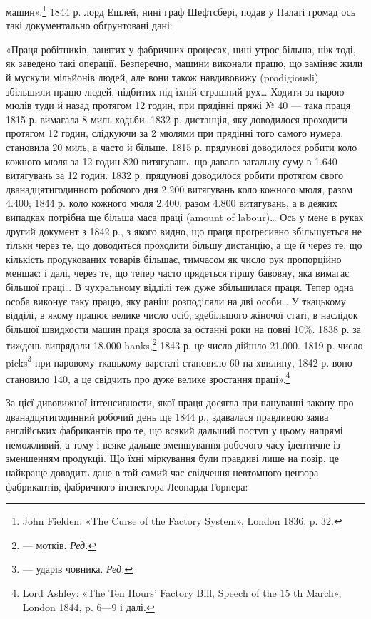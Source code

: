 \parcont{}  %
машин».\footnote{
John Fielden: «The Curse of the Factory System», London
1836, p. 32.
} 1844 р. лорд Ешлей, нині граф Шефтсбері, подав
у Палаті громад ось такі документально обґрунтовані дані:

«Праця робітників, занятих у фабричних процесах, нині утроє
більша, ніж тоді, як заведено такі операції. Безперечно, машини
виконали працю, що заміняє жили й мускули мільйонів людей,
але вони також навдивовижу (prodigiousli) збільшили працю
людей, підбитих під їхній страшний рух\dots{} Ходити за парою
мюлів туди й назад протягом 12 годин, при прядінні пряжі
№ 40 — така праця 1815 р. вимагала 8 миль ходьби. 1832 р.
дистанція, яку доводилося проходити протягом 12 годин, слідкуючи
за 2 мюлями при прядінні того самого нумера, становила
20 миль, а часто й більше. 1815 р. прядунові доводилося робити
коло кожного мюля за 12 годин 820 витягувань, що давало загальну
суму в 1.640 витягувань за 12 годин. 1832 р. прядунові
доводилося робити протягом свого дванадцятигодинного робочого
дня 2.200 витягувань коло кожного мюля, разом 4.400; 1844 р.
коло кожного мюля 2.400, разом 4.800 витягувань, а в деяких
випадках потрібна ще більша маса праці (amount of labour)\dots{}
Ось у мене в руках другий документ з 1842 р., з якого видно,
що праця проґресивно збільшується не тільки через те, що доводиться
проходити більшу дистанцію, а ще й через те, що кількість
продукованих товарів більшає, тимчасом як число рук пропорційно
меншає: і далі, через те, що тепер часто прядеться гіршу
бавовну, яка вимагає більшої праці\dots{} В чухральному відділі
теж дуже збільшилася праця. Тепер одна особа виконує таку
працю, яку раніш розподіляли на дві особи\dots{} У ткацькому відділі,
в якому працює велике число осіб, здебільшого жіночої
статі, в наслідок більшої швидкости машин праця зросла за
останні роки на повні 10\%. 1838 р. за тиждень випрядали 18.000
hanks,\footnote*{
— мотків. \emph{Ред.}
} 1843 р. це число дійшло 21.000. 1819 р. число picks\footnote*{
— ударів човника. \emph{Ред.}
}
при паровому ткацькому варстаті становило 60 на хвилину, 1842 р.
воно становило 140, а це свідчить про дуже велике зростання
праці».\footnote{
Lord Ashley: «The Ten Hours’ Factory Bill, Speech of the 15 th
March», London 1844, p. 6—9 і далі.
}

За цієї дивовижної інтенсивности, якої праця досягла при пануванні
закону про дванадцятигодинний робочий день ще 1844 р.,
здавалася правдивою заява англійських фабрикантів про те,
що всякий дальший поступ у цьому напрямі неможливий, а
тому і всяке дальше зменшування робочого часу ідентичне із
зменшенням продукції. Що їхні міркування були правдиві лише
на позір, це найкраще доводить дане в той самий час свідчення
невтомного цензора фабрикантів, фабричного інспектора Леонарда
Горнера:
